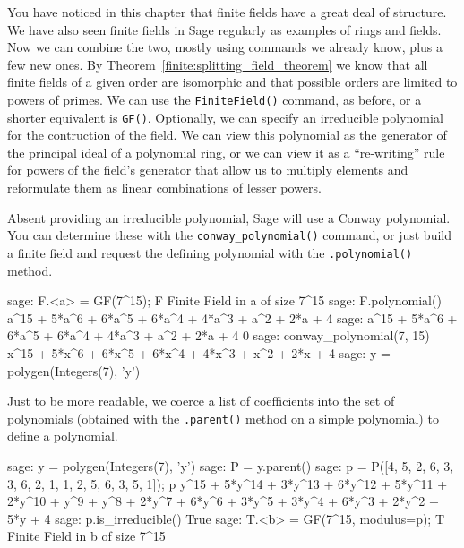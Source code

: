 You have noticed in this chapter that finite fields have a great deal of structure.  We have also seen finite fields in Sage regularly as examples of rings and fields.  Now we can combine the two, mostly using commands we already know, plus a few new ones.
%
%
By Theorem~\ref{finite:splitting_field_theorem} we know that all finite fields of a given order are isomorphic and that possible orders are limited to powers of primes.  We can use the \verb?FiniteField()? command, as before, or a shorter equivalent is \verb?GF()?.  Optionally, we can specify an irreducible polynomial for the contruction of the field.  We can view this polynomial as the generator of the principal ideal of a polynomial ring, or we can view it as a ``re-writing'' rule for powers of the field's generator that allow us to multiply elements and reformulate them as linear combinations of lesser powers.\par
%
Absent providing an irreducible polynomial, Sage will use a Conway polynomial.  You can determine these with the \verb?conway_polynomial()? command, or just build a finite field and request the defining polynomial with the \verb?.polynomial()? method.
%
\begin{sageexample}
sage: F.<a> = GF(7^15); F
Finite Field in a of size 7^15
sage: F.polynomial()
a^15 + 5*a^6 + 6*a^5 + 6*a^4 + 4*a^3 + a^2 + 2*a + 4
sage: a^15 + 5*a^6 + 6*a^5 + 6*a^4 + 4*a^3 + a^2 + 2*a + 4
0
sage: conway_polynomial(7, 15)
x^15 + 5*x^6 + 6*x^5 + 6*x^4 + 4*x^3 + x^2 + 2*x + 4
sage: y = polygen(Integers(7), 'y')
\end{sageexample}
%
Just to be more readable, we coerce a list of coefficients into the set of polynomials (obtained with the \verb?.parent()? method on a simple polynomial) to define a polynomial.
%
\begin{sageexample}
sage: y = polygen(Integers(7), 'y')
sage: P = y.parent()
sage: p = P([4, 5, 2, 6, 3, 3, 6, 2, 1, 1, 2, 5, 6, 3, 5, 1]); p
y^15 + 5*y^14 + 3*y^13 + 6*y^12 + 5*y^11 + 2*y^10 + y^9 +
y^8 + 2*y^7 + 6*y^6 + 3*y^5 + 3*y^4 + 6*y^3 + 2*y^2 + 5*y + 4
sage: p.is_irreducible()
True
sage: T.<b> = GF(7^15, modulus=p); T
Finite Field in b of size 7^15
\end{sageexample}

